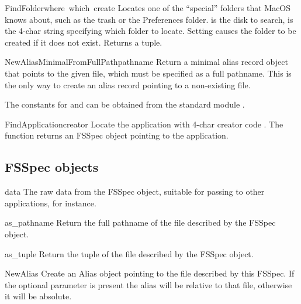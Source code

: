 \begin{funcdesc}{FindFolder}{where\, which\, create}
Locates one of the ``special'' folders that MacOS knows about, such as
the trash or the Preferences folder.  is the disk to
search,  is the 4-char string specifying which folder to
locate. Setting  causes the folder to be created if it
does not exist. Returns a  tuple.

\begin{funcdesc}{NewAliasMinimalFromFullPath}{pathname}
Return a minimal alias record object that points to the given file, which
must be specified as a full pathname. This is the only way to create an
alias record pointing to a non-existing file.

The constants for  and  can be obtained from the
standard module .
\end{funcdesc}

\begin{funcdesc}{FindApplication}{creator}
Locate the application with 4-char creator code . The
function returns an FSSpec object pointing to the application.
\end{funcdesc}

\subsection{FSSpec objects}

\renewcommand{\indexsubitem}{(FSSpec object attribute)}
\begin{datadesc}{data}
The raw data from the FSSpec object, suitable for passing
to other applications, for instance.
\end{datadesc}

\renewcommand{\indexsubitem}{(FSSpec object method)}
\begin{funcdesc}{as_pathname}{}
Return the full pathname of the file described by the FSSpec object.
\end{funcdesc}

\begin{funcdesc}{as_tuple}{}
Return the  tuple of the file described
by the FSSpec object.
\end{funcdesc}

\begin{funcdesc}{NewAlias}{}
Create an Alias object pointing to the file described by this
FSSpec. If the optional  parameter is present the alias
will be relative to that file, otherwise it will be absolute.
\end{funcdesc}


\end{funcdesc}
